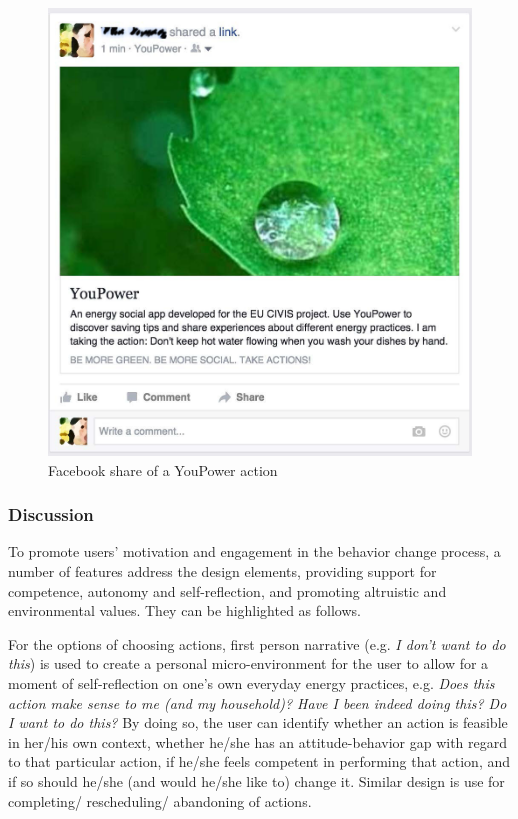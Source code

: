 \documentclass[a4paper]{article}
\begin{document}
\begin{figure}[t!]
\centering
\includegraphics[width=0.55\linewidth]{img/share}
\caption{Facebook share of a YouPower action}
\label{fig:share}
\end{figure}

\subsubsection{Discussion} 
\label{sec:example:motivation:discussions}

To promote users' motivation and engagement in the behavior change process, a number of features address the design elements, providing support for competence, autonomy and self-reflection, and promoting altruistic and environmental values. They can be highlighted as follows.

For the options of choosing actions, first person narrative (e.g. \textit{I don't want to do this}) is used to create a personal micro-environment for the user \citep{Crumlish2009} to allow for a moment of self-reflection on one's own everyday energy practices, e.g. \textit{Does this action make sense to me (and my household)? Have I been indeed doing this? Do I want to do this?} By doing so, the user can identify whether an action is feasible in her/his own context, whether he/she has an attitude-behavior gap with regard to that particular action, if he/she feels competent in performing that action, and if so should he/she (and would he/she like to) change it. Similar design is use for completing/ rescheduling/ abandoning of actions. 
\end{document}
